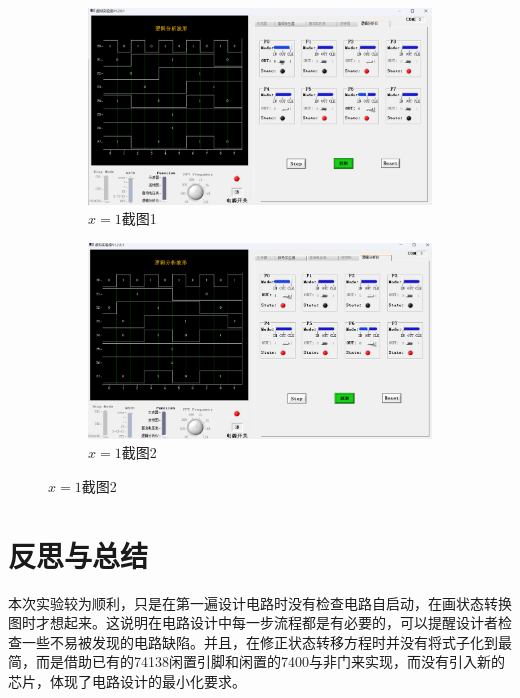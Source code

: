 \documentclass{ctexart}
\begin{document}
\begin{figure}[H]
    \centering
    \begin{minipage}{0.4\textwidth}
        \begin{figure}[H]
            \centering
            \includegraphics[width=\textwidth]{x=1_1.png}
            \caption{$x=1$截图1}
        \end{figure}
    \end{minipage}
    \hspace{0.1\textwidth}
    \begin{minipage}{0.4\textwidth}
        \begin{figure}[H]
            \centering
            \includegraphics[width=\textwidth]{x=1_2.png}
            \caption{$x=1$截图2}
        \end{figure}
    \end{minipage}
\end{figure}
\section{反思与总结}
本次实验较为顺利，只是在第一遍设计电路时没有检查电路自启动，在画状态转换图时才想起来。这说明在电路设计中每一步流程都是有必要的，可以提醒设计者检查一些不易被发现的电路缺陷。并且，在修正状态转移方程时并没有将式子化到最简，而是借助已有的74138闲置引脚和闲置的7400与非门来实现，而没有引入新的芯片，体现了电路设计的最小化要求。
\end{document}
